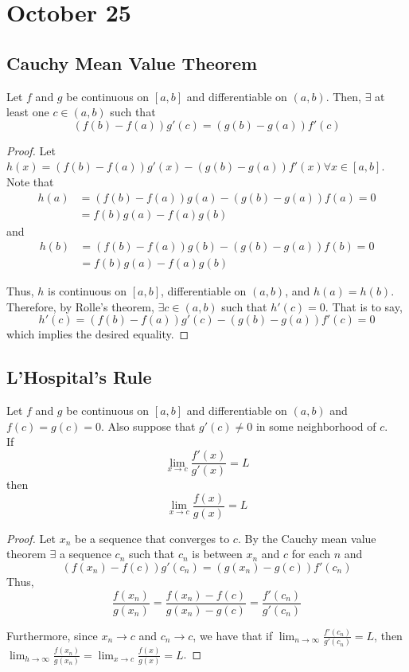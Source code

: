\section{October 25}

\subsection{Cauchy Mean Value Theorem}
\begin{theorem}
    Let $f$ and $g$ be continuous on $[a, b]$ and differentiable on $(a, b)$. Then, $\exists$ at least one $c \in (a, b)$ such that $$(f(b) - f(a)) g'(c) = (g(b) - g(a)) f'(c)$$
\end{theorem}
\begin{proof}
    Let $h(x) = (f(b) - f(a)) g'(x) - (g(b) - g(a)) f'(x) \forall x \in [a, b]$. \\
    Note that
    \begin{align*}
        h(a) &= (f(b) - f(a)) g(a) - (g(b) - g(a)) f(a) = 0 \\
        &= f(b)g(a) - f(a)g(b)
    \end{align*}
    and
    \begin{align*}
        h(b) &= (f(b) - f(a)) g(b) - (g(b) - g(a)) f(b) = 0 \\
        &= f(b)g(a) - f(a)g(b)
    \end{align*}

    Thus, $h$ is continuous on $[a, b]$, differentiable on $(a, b)$, and $h(a) = h(b)$. Therefore, by Rolle's theorem, $\exists c \in (a, b)$ such that $h'(c) = 0$. That is to say, $$h'(c) = (f(b) - f(a)) g'(c) - (g(b) - g(a)) f'(c) = 0$$ which implies the desired equality.
\end{proof}

\subsection{L'Hospital's Rule}
\begin{theorem}
    Let $f$ and $g$ be continuous on $[a, b]$ and differentiable on $(a, b)$ and $f(c) = g(c) = 0$. Also suppose that $g'(c) \neq 0$ in some neighborhood of $c$. \\
    If $$\lim_{x \to c} \frac{f'(x)}{g'(x)} = L$$ then $$\lim_{x \to c} \frac{f(x)}{g(x)} = L$$
\end{theorem}
\begin{proof}
    Let $x_n$ be a sequence that converges to $c$. By the Cauchy mean value theorem $\exists$ a sequence $c_n$ such that $c_n$ is between $x_n$ and $c$ for each $n$ and $$(f(x_n) - f(c)) g'(c_n) = (g(x_n) - g(c)) f'(c_n)$$ Thus, $$\frac{f(x_n)}{g(x_n)} = \frac{f(x_n) - f(c)}{g(x_n) - g(c)} = \frac{f'(c_n)}{g'(c_n)}$$

    Furthermore, since $x_n \to c$ and $c_n \to c$, we have that if $\lim_{n \to \infty} \frac{f'(c_n)}{g'(c_n)} = L$, then $\lim_{h \to \infty} \frac{f(x_n)}{g(x_n)} = \lim_{x \to c} \frac{f(x)}{g(x)} = L$.
\end{proof}

